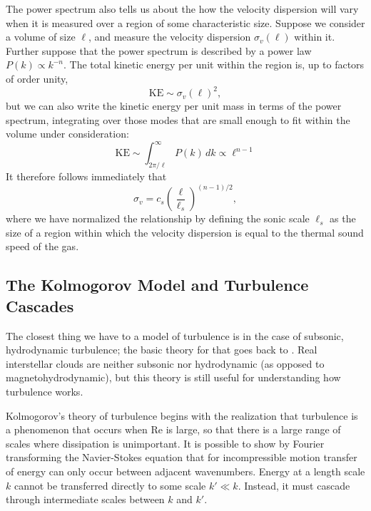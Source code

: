 The power spectrum also tells us about the how the velocity dispersion will vary when it is measured over a region of some characteristic size. Suppose we consider a volume of size $\ell$, and measure the velocity dispersion $\sigma_v(\ell)$ within it. Further suppose that the power spectrum is described by a power law $P(k)\propto k^{-n}$. The total kinetic energy per unit within the region is, up to factors of order unity,
\begin{equation}
\mathrm{KE} \sim \sigma_v(\ell)^2,
\end{equation}
but we can also write the kinetic energy per unit mass in terms of the power spectrum, integrating over those modes that are small enough to fit within the volume under consideration:
\begin{equation}
\mathrm{KE} \sim \int_{2\pi/\ell}^\infty P(k) \, dk \propto \ell^{n-1}
\end{equation}
It therefore follows immediately that
\begin{equation}
\label{eq:vdisp}
\sigma_v = c_s \left(\frac{\ell}{\ell_s}\right)^{(n-1)/2},
\end{equation}
where we have normalized the relationship by defining the sonic scale $\ell_s$ as the size of a region within which the velocity dispersion is equal to the thermal sound speed of the gas.

\subsection{The Kolmogorov Model and Turbulence Cascades}

The closest thing we have to a model of turbulence is in the case of subsonic, hydrodynamic turbulence; the basic theory for that goes back to \citet{kolmogorov41a}. Real interstellar clouds are neither subsonic nor hydrodynamic (as opposed to magnetohydrodynamic), but this theory is still useful for understanding how turbulence works.

Kolmogorov's theory of turbulence begins with the realization that turbulence is a phenomenon that occurs when Re is large, so that there is a large range of scales where dissipation is unimportant. It is possible to show by Fourier transforming the Navier-Stokes equation that for incompressible motion transfer of energy can only occur between adjacent wavenumbers. Energy at a length scale $k$ cannot be transferred directly to some scale $k' \ll k$. Instead, it must cascade through intermediate scales between $k$ and $k'$.

